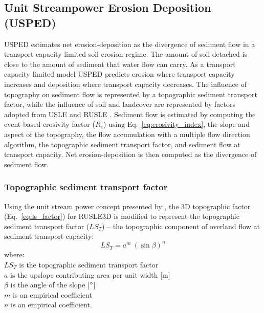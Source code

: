 \documentclass[gmd, manuscript]{copernicus}
\begin{document}
\subsection{Unit Streampower Erosion Deposition (USPED)} \label{usped_model}
USPED estimates net erosion-deposition 
as the divergence of sediment flow
in a transport capacity limited soil erosion regime.
The amount of soil detached is 
close to the amount of sediment that water flow can carry.
As a transport capacity limited model
USPED predicts erosion where transport capacity increases
and deposition where transport capacity decreases. 
The influence of topography on sediment flow  
is represented by a topographic sediment transport factor,
while the influence of soil and landcover are represented by 
factors adopted from USLE and RUSLE
\citep{Mitasova1996}.
%
Sediment flow is estimated by computing
the event-based erosivity factor ($R_e$) 
using Eq.~\ref{eq:erosivity_index},
the slope and aspect of the topography,
the flow accumulation with a multiple flow direction algorithm,
the topographic sediment transport factor,
and sediment flow at transport capacity.
Net erosion-deposition is then computed as the divergence of sediment flow. 

\subsubsection{Topographic sediment transport factor}
Using the unit stream power concept presented by \citet{Moore1986},
the 3D topographic factor (Eq.~\ref{eq:ls_factor}) 
for RUSLE3D is modified to represent 
the topographic sediment transport factor ($LS_T$) --
the topographic component 
of overland flow at sediment transport capacity:
%
\begin{equation}
\label{eq:lst_factor}
{LS_T = a^{m} ~ (\sin \beta)^{n}}
\end{equation}
%
{\small
\noindent
where: \\
\noindent
\hspace*{0.5em} $LS_T$ is the topographic sediment transport factor\\
\hspace*{0.5em} $a$ is the upslope contributing area per unit width [\unit{m}]\\
\hspace*{0.5em} $\beta$ is the angle of the slope [$^{\circ}$]\\
\hspace*{0.5em} $m$ is an empirical coefficient\\
\hspace*{0.5em} $n$ is an empirical coefficient.\\
}
\end{document}
